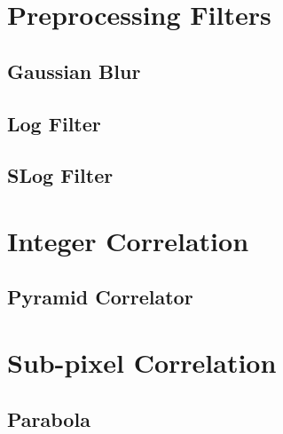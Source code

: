 \section{Preprocessing Filters}

\subsection{Gaussian Blur}

\subsection{Log Filter}

\subsection{SLog Filter}

\section{Integer Correlation}

\subsection{Pyramid Correlator}

\section{Sub-pixel Correlation}

\subsection{Parabola}


